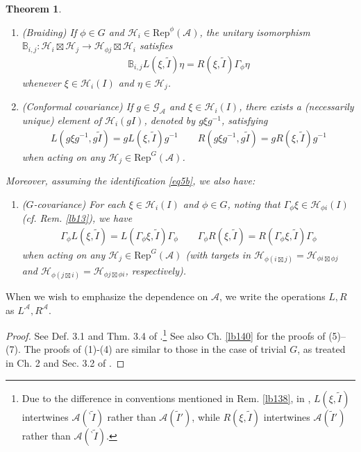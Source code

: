 \documentclass[11pt,b5paper,notitlepage]{article}
\theoremstyle{definition}
\theoremstyle{plain}
\newtheorem{thm}[df]{Theorem}
\newcommand{\wtd}{\widetilde}
\newcommand{\Rep}{\mathrm{Rep}}
\newcommand{\RepGA}{\mathrm{Rep}^G(\mathcal A)}
\newcommand{\GA}{\mathscr G_{\mathcal A}}
\renewcommand{\Bbb}{\mathbb B}
\newcommand{\bpr}{{}^\backprime}
\newcommand{\MA}{\mathcal A}
\newcommand{\MH}{\mathcal H}
\numberwithin{equation}{section}
\begin{document}
\begin{thm}
\begin{enumerate}[label=(\arabic*)]
\begin{equation}
\begin{tikzcd}
\MH_i\boxtimes\MH_k\arrow[rr,"{R(\eta,\wtd J)}"] &&\MH_i\boxtimes\MH_k\boxtimes\MH_j
\end{tikzcd}
\end{equation}
\item (Braiding) If $\phi\in G$ and $\MH_i\in\Rep^\phi(\MA)$, the unitary isomorphism $\Bbb_{i,j}:\MH_i\boxtimes\MH_j\rightarrow\MH_{\phi j}\boxtimes \MH_i$ satisfies
\begin{align}
\Bbb_{i,j} L(\xi,\wtd I)\eta=R(\xi,\wtd I)\Gamma_\phi\eta
\end{align}
whenever $\xi\in\MH_i(I)$ and $\eta\in\MH_j$.
\item (Conformal covariance) If $g\in\GA$ and $\xi\in\MH_i(I)$, there exists a (necessarily unique) element of $\MH_i(gI)$, denoted by $g\xi g^{-1}$, satisfying
\begin{align}\label{eq14}
L(g\xi g^{-1},g\wtd I)=gL(\xi,\wtd I)g^{-1}\qquad R(g\xi g^{-1},g\wtd I)=gR(\xi,\wtd I)g^{-1}
\end{align}
when acting on any $\MH_j\in\RepGA$.
\end{enumerate}
Moreover, assuming the identification \eqref{eq5b}, we also have:
\begin{enumerate}
\item[(7)] ($G$-covariance) For each $\xi\in\MH_i(I)$ and $\phi\in G$, noting that $\Gamma_\phi\xi\in\MH_{\phi i}(I)$ (cf. Rem. \ref{lb13}), we have
\begin{align}\label{eq75}
\Gamma_\phi L(\xi,\wtd I)=L(\Gamma_\phi\xi,\wtd I)\Gamma_\phi\qquad \Gamma_\phi R(\xi,\wtd I)=R(\Gamma_\phi\xi,\wtd I)\Gamma_\phi
\end{align}
when acting on any $\MH_j\in\RepGA$ (with targets in $\MH_{\phi(i\boxtimes j)}=\MH_{\phi i\boxtimes\phi j}$ and $\MH_{\phi(j\boxtimes i)}=\MH_{\phi j\boxtimes\phi i}$, respectively).
\end{enumerate}
\end{thm}

When we wish to emphasize the dependence on $\MA$, we write the operations $L,R$ as $L^\MA,R^\MA$. 


\begin{proof}
See Def. 3.1 and Thm. 3.4 of \cite{MS26b}.\footnote{Due to the difference in conventions mentioned in Rem. \ref{lb138}, in \cite{MS26a,MS26b}, $L(\xi,\wtd I)$ intertwines $\MA(\bpr\wtd I)$ rather than $\MA(\wtd I')$, while $R(\xi,\wtd I)$ intertwines $\MA(\wtd I')$ rather than $\MA(\bpr\wtd I)$.} See also Ch. \ref{lb140} for the proofs of (5)--(7). The proofs of (1)-(4) are similar to those in the case of trivial $G$, as treated in Ch. 2 and Sec. 3.2 of \cite{Gui21a}.
\end{proof}
\end{document}
